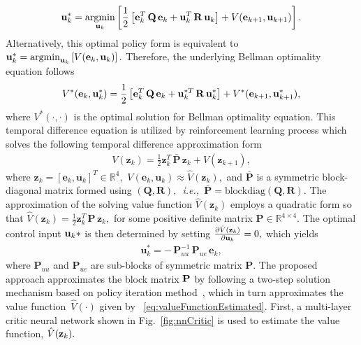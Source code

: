 \documentclass[conference]{IEEEtran}
\DeclareMathOperator*{\argmin}{arg min}
\begin{document}
 \begin{align*}
 {\bf u}^*_k = \argmin_{{\bf u}_k}\left[\frac{1}{2}\left[{\bf e}^T_k\,  {\bf Q}\, {\bf e}_k +{\bf u}^T_k\,  {\bf R} \,  {\bf u}_k\right]   +
 V({\bf e}_{k+1},{\bf u}_{k+1})\right].
 \label{eq:argMinControlAction}
 \end{align*}
 Alternatively, this optimal  policy form is equivalent to ${\bf u}^*_k = \argmin_{{\bf u}_k}\left[
 V({\bf e}_{k},{\bf u}_{k})\right].$
 Therefore, the underlying Bellman optimality equation follows %
 \begin{equation*}
 \label{eq:BellOpt}
 V^*({\bf e}_k,{\bf u}^*_k)= \frac{1}{2}\left[{\bf e}_k^T\, {\bf Q}\, {\bf e}_k + {\bf u}_k^{*T}\, {\bf R}\, {\bf u}^*_k\right] +V^*({\bf e}_{k+1},{\bf u}^*_{k+1}),
 \end{equation*}
 where $V^*(\cdot,\cdot)$ is the optimal solution for Bellman optimality equation. This temporal difference equation is utilized by reinforcement learning process which solves the following temporal difference approximation form %
 \begin{align}
   V(\mathbf{z}_k) = \frac{1}{2}\mathbf{z}_k^T\, \bar{\mathbf{P}}\, \mathbf{z}_k + V(\mathbf{z}_{k+1}),
 \label{eq:valueFunctionEstimated}
 \end{align}
 where $\mathbf{z}_k = \left[\mathbf{e}_k ,\mathbf{u}_k\right]^T\in\mathbb{R}^4,$ $V\left(\mathbf{e}_k,\mathbf{u}_k\right) \approx \hat{V}(\mathbf{z}_k),$  and $\bar{\mathbf{P}}$ is a symmetric block-diagonal matrix formed using $(\mathbf{Q},\mathbf{R}),$~\textit{i.e.,~}$\bar{\mathbf{P}} = \mathrm{blockdiag}(\mathbf{Q},\mathbf{R}).$ %
 The approximation of the solving value function $\hat{V}(\mathbf{z}_k)$ employs a quadratic form so that $\hat{V}(\mathbf{z}_k)=\frac{1}{2}\mathbf{z}_k^T\, \mathbf{P}\, \mathbf{z}_k,$ for some positive definite matrix  $\mathbf{P}\in\mathbb{R}^{4\times 4}.$ The optimal control input ${\bf u}_k*$ is then determined by setting $\frac{\partial\hat{V}({\bf z}_k)}{\partial{\bf u}_k} = 0,$ which yields %
 \begin{align}
 \label{eq:modelFreePolicy}    
 \mathbf{u}_k^* = -\,  \mathbf{P}_{uu}^{-1}\, \mathbf{P}_{ue}\, \mathbf{e}_k,
 \end{align}
 where $\mathbf{P}_{uu}$ and $\mathbf{P}_{ue}$ are sub-blocks of symmetric matrix $\mathbf{P}.$ The proposed approach approximates the block matrix ${\bf P}$ by following a two-step solution mechanism based on policy iteration method~\cite{sutton2020reinforcement}, which in turn approximates the value function~$\hat V(\cdot)$ given by ~\eqref{eq:valueFunctionEstimated}. First, a multi-layer critic neural network shown in Fig.~\ref{fig:nnCritic} is used to estimate the value function, $\hat V({\bf z}_k).$ 
\end{document}
